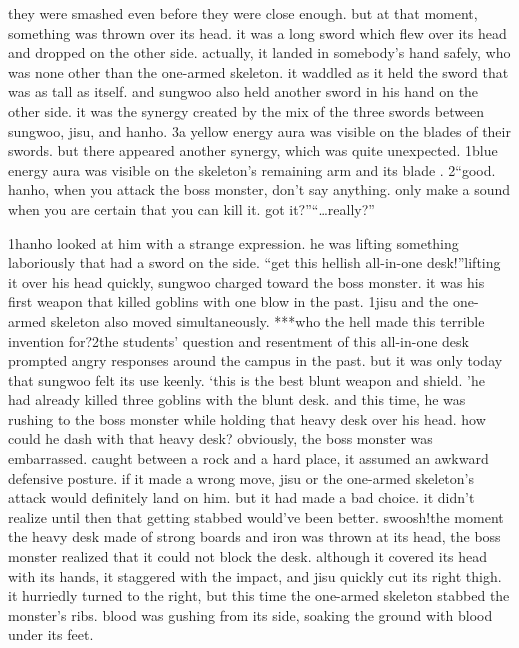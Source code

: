  they were smashed even before they were close enough.
but at that moment, something was thrown over its head.
 it was a long sword which flew over its head and dropped on the other side.
actually, it landed in somebody’s hand safely, who was none other than the one-armed skeleton.
 it waddled as it held the sword that was as tall as itself.
and sungwoo also held another sword in his hand on the other side.
it was the synergy created by the mix of the three swords between sungwoo, jisu, and hanho.
3a yellow energy aura was visible on the blades of their swords.
but there appeared another synergy, which was quite unexpected.
1blue energy aura was visible on the skeleton’s remaining arm and its blade .
2“good.
 hanho, when you attack the boss monster, don’t say anything.
 only make a sound when you are certain that you can kill it.
 got it?”“…really?”

1hanho looked at him with a strange expression.
 he was lifting something laboriously that had a sword on the side.
“get this hellish all-in-one desk!”lifting it over his head quickly, sungwoo charged toward the boss monster.
it was his first weapon that killed goblins with one blow in the past.
1jisu and the one-armed skeleton also moved simultaneously.
***who the hell made this terrible invention for?2the students’ question and resentment of this all-in-one desk prompted angry responses around the campus in the past.
 but it was only today that sungwoo felt its use keenly.
‘this is the best blunt weapon and shield.
’he had already killed three goblins with the blunt desk.
 and this time, he was rushing to the boss monster while holding that heavy desk over his head.
how could he dash with that heavy desk? obviously, the boss monster was embarrassed.
caught between a rock and a hard place, it assumed an awkward defensive posture.
 if it made a wrong move, jisu or the one-armed skeleton’s attack would definitely land on him.
but it had made a bad choice.
 it didn’t realize until then that getting stabbed would’ve been better.
swoosh!the moment the heavy desk made of strong boards and iron was thrown at its head, the boss monster realized that it could not block the desk.
although it covered its head with its hands, it staggered with the impact, and jisu quickly cut its right thigh.
 it hurriedly turned to the right, but this time the one-armed skeleton stabbed the monster’s ribs.
blood was gushing from its side, soaking the ground with blood under its feet.


 